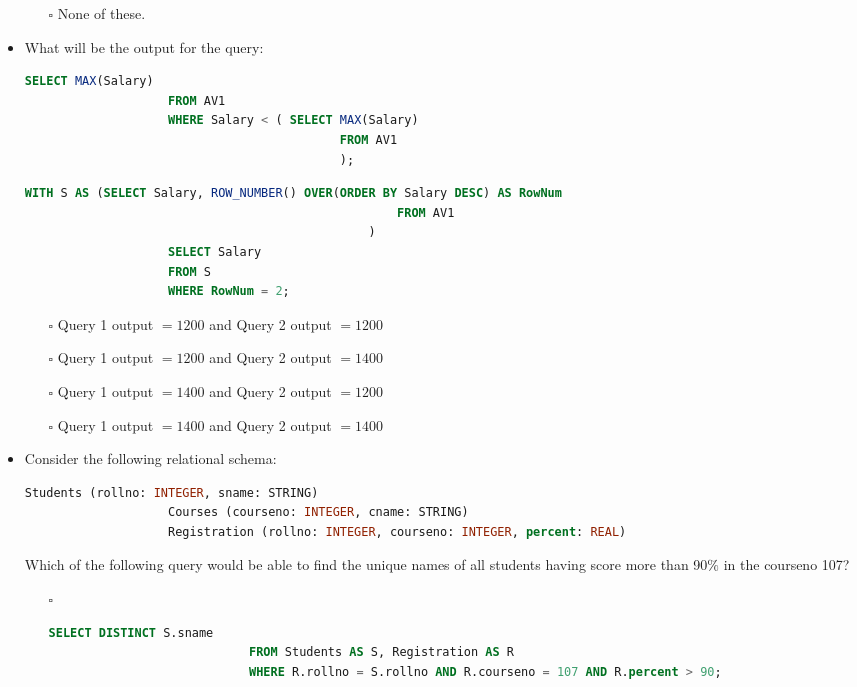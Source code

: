 \documentclass[10pt]{article}
\begin{document}
\begin{itemize}
\begin{enumerate}
					\item[$\square$] None of these.
				\end{enumerate}

			\item What will be the output for the query:
				\begin{lstlisting}[language=SQL,firstline=1, lastline=6] 
					SELECT MAX(Salary) 
					FROM AV1 
					WHERE Salary < ( SELECT MAX(Salary) 
											FROM AV1 
											);
				\end{lstlisting}
				\begin{lstlisting}[language=SQL,firstline=1, lastline=6] 
					WITH S AS (SELECT Salary, ROW_NUMBER() OVER(ORDER BY Salary DESC) AS RowNum 
													FROM AV1
												) 
					SELECT Salary 
					FROM S 
					WHERE RowNum = 2;
				\end{lstlisting}
				\begin{enumerate}
					\item[$\square$] Query 1 output $= 1200$ and Query 2 output $= 1200$
					\item[$\square$] Query 1 output $= 1200$ and Query 2 output $= 1400$
					\item[$\square$] Query 1 output $= 1400$ and Query 2 output $= 1200$
					\item[$\square$] Query 1 output $= 1400$ and Query 2 output $= 1400$
				\end{enumerate}

			\newpage

			\item Consider the following relational schema:
				\begin{lstlisting}[language=SQL,firstline=1, lastline=3] 
					Students (rollno: INTEGER, sname: STRING)
					Courses (courseno: INTEGER, cname: STRING)
					Registration (rollno: INTEGER, courseno: INTEGER, percent: REAL)
				\end{lstlisting}
				Which of the following query would be able to find the unique names of all students having score more than 90$\%$ in the courseno 107?
				\begin{enumerate}
					\item[$\square$] 
						\begin{lstlisting}[language=SQL,firstline=1, lastline=3, numbers = right] 
							SELECT DISTINCT S.sname 
							FROM Students AS S, Registration AS R 
							WHERE R.rollno = S.rollno AND R.courseno = 107 AND R.percent > 90;
						\end{lstlisting}
						

\end{enumerate}
\end{itemize}
\end{document}
